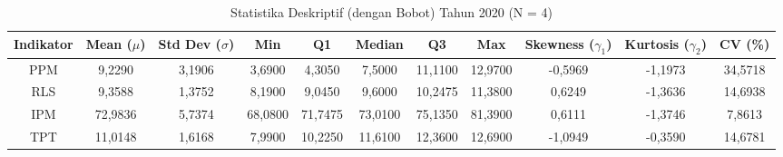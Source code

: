 \begin{table}[H]
\centering
\caption{Statistika Deskriptif (dengan Bobot) Tahun 2020 (N = 4)} \label{tab:sample1desc_2020}
\begin{adjustbox}{max width=\textwidth, max height=0.85\textheight}
\begin{tabular}{|c|c|c|c|c|c|c|c|c|c|c|}
\hline
\textbf{Indikator} & \textbf{Mean ($\mu$)} & \textbf{Std Dev ($\sigma$)} & \textbf{Min} & \textbf{Q1} & \textbf{Median} & \textbf{Q3} & \textbf{Max} & \textbf{Skewness ($\gamma_1$)} & \textbf{Kurtosis ($\gamma_2$)} & \textbf{CV (\%)} \\
\hline
PPM & 9,2290 & 3,1906 & 3,6900 & 4,3050 & 7,5000 & 11,1100 & 12,9700 & -0,5969 & -1,1973 & 34,5718 \\
RLS & 9,3588 & 1,3752 & 8,1900 & 9,0450 & 9,6000 & 10,2475 & 11,3800 & 0,6249 & -1,3636 & 14,6938 \\
IPM & 72,9836 & 5,7374 & 68,0800 & 71,7475 & 73,0100 & 75,1350 & 81,3900 & 0,6111 & -1,3746 & 7,8613 \\
TPT & 11,0148 & 1,6168 & 7,9900 & 10,2250 & 11,6100 & 12,3600 & 12,6900 & -1,0949 & -0,3590 & 14,6781 \\
\hline
\end{tabular}
\end{adjustbox}
\end{table}